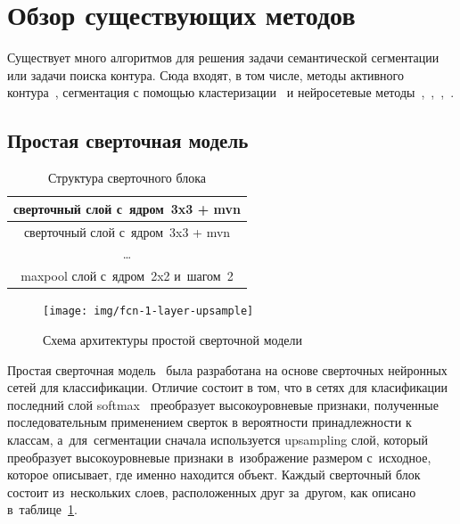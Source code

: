 \section{Обзор существующих методов}

Существует много алгоритмов для решения задачи семантической сегментации или задачи поиска контура. Сюда входят, в том числе, методы активного контура~\cite{snakes}, сегментация с помощью кластеризации~\cite{clustering_segm} и нейросетевые методы~\cite{fcn},~\cite{unet},~\cite{gridnet},~\cite{deeplab}.

\subsection{Простая сверточная модель}

\begin{table}[b]
  \begin{center}
    \caption{Структура сверточного блока} \label{tab:conv_block}
    \begin{tabular}{ c }
      \hline
      сверточный слой с~ядром~3x3 + mvn     \\ \hline
      сверточный слой с~ядром~3x3 + mvn     \\ \hline
      \dots                                 \\ \hline
      maxpool слой с~ядром~2x2 и~шагом~2    \\ 
      \hline
    \end{tabular}
  \end{center}
\end{table}

\begin{figure}[ht]
  \texttt{[image: img/fcn-1-layer-upsample]}
  \caption{Схема архитектуры простой сверточной модели}
\end{figure}

Простая сверточная модель~\cite{fcn_1_layer_upsample} была разработана на основе сверточных нейронных сетей для классификации. Отличие состоит в том, что в сетях для класификации последний слой softmax~\cite{classification_loss} преобразует высокоуровневые признаки, полученные последовательным применением сверток в вероятности принадлежности к классам, а~для~сегментации сначала используется upsampling слой, который преобразует высокоуровневые признаки в~изображение размером с~исходное, которое описывает, где именно находится объект. Каждый сверточный блок состоит из~нескольких слоев, расположенных друг за~другом, как описано в~таблице~\ref{tab:conv_block}.

